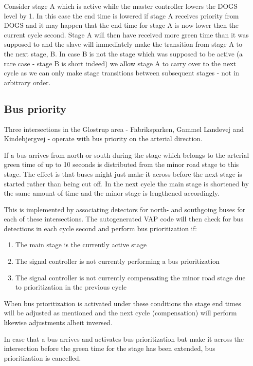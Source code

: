 Consider stage A which is active while the master controller lowers the DOGS level by 1. In this case the end time is lowered if stage A receives priority from DOGS and it may happen that the end time for stage A is now lower then the current cycle second. Stage A will then have received more green time than it was supposed to and the slave will immediately make the transition from stage A to the next stage, B. In case B is not the stage which was supposed to be active (a rare case - stage B is short indeed) we allow stage A to carry over to the next cycle as we can only make stage transitions between subsequent stages - not in arbitrary order.

\subsection{Bus priority}
Three intersections in the Glostrup area - Fabriksparken, Gammel Landevej and Kindebjergvej - operate with bus priority on the arterial direction. 

If a bus arrives from north or south during the stage which belongs to the arterial green time of up to 10 seconds is distributed from the minor road stage to this stage. The effect is that buses might just make it across before the next stage is started rather than being cut off. In the next cycle the main stage is shortened by the same amount of time and the minor stage is lengthened accordingly.

This is implemented by associating detectors for north- and southgoing buses for each of these intersections. The autogenerated VAP code will then check for bus detections in each cycle second and perform bus prioritization if:

\begin{enumerate}
\item The main stage is the currently active stage
\item The signal controller is not currently performing a bus prioritization
\item The signal controller is not currently compensating the minor road stage due to prioritization in the previous cycle
\end{enumerate}

When bus prioritization is activated under these conditions the stage end times will be adjusted as mentioned and the next cycle (compensation) will perform likewise adjustments albeit inversed.

In case that a bus arrives and activates bus prioritization but make it across the intersection before the green time for the stage has been extended, bus prioritization is cancelled.